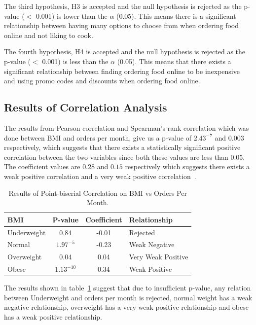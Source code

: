 \documentclass[a4paper,fleqn]{cas-sc}
\begin{document}
The third hypothesis, H3 is accepted and the null hypothesis is rejected as the p-value ($<$ 0.001) is lower than the $\alpha$ (0.05). This means there is a significant relationship between having many options to choose from when ordering food online and not liking to cook. 

The fourth hypothesis, H4 is accepted and the null hypothesis is rejected as the p-value ($<$ 0.001) is less than the $\alpha$ (0.05). This means that there exists a significant relationship between finding ordering food online to be inexpensive and using promo codes and discounts when ordering food online. 

\subsection{Results of Correlation Analysis}
The results from Pearson correlation and Spearman's rank correlation which was done between BMI and orders per month, give us a p-value of $2.43^{-7}$ and $0.003$ respectively, which suggests that there exists a statistically significant positive correlation between the two variables since both these values are less than 0.05. The coefficient values are $0.28$ and $0.15$ respectively which suggests there exists a weak positive correlation and a very weak positive correlation~\cite{jaadi_2019}. 


\begin{table}[htb]
    \caption{Results of Point-biserial Correlation on BMI vs Orders Per Month.}
    \label{tab:Pbi_BMI_OPM}
    \begin{tabular*}{\linewidth}{@{\extracolsep{\fill}}lccl@{}}
        \toprule
        BMI & P-value & Coefficient & Relationship \\
        \midrule
        Underweight & 0.84 & -0.01 & Rejected \\
        Normal & $1.97^{-5}$ & -0.23 &  Weak Negative \\
        Overweight & 0.04 & 0.04 & Very Weak Positive \\
        Obese & $1.13^{-10}$ & 0.34 & Weak Positive \\
        \bottomrule
    \end{tabular*}
\end{table}


The results shown in table~\ref{tab:Pbi_BMI_OPM} suggest that due to insufficient p-value, any relation between Underweight and orders per month is rejected, normal weight has a weak negative relationship, overweight has a very weak positive relationship and obese has a weak positive relationship. 
\end{document}
